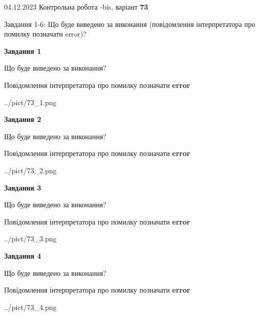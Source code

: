 \documentclass[12pt, ukrainian]{article}
\begin{document}
{{04.12.2023 Контрольна робота -bis, варіант  \No \textbf { 73 }\par}}
{

Завдання 1-6: Що буде виведено за виконання (повідомлення інтерпретатора про помилку позначати error)?


{\begin {center}\textbf{Завдання 1}\end {center}}\par
Що буде виведено за виконання? \par
Повідомлення інтерпретатора про помилку позначати \textbf{error}

\begin{center}
	{../pict/73_1.png}
\end{center}
\newpage

{\begin {center}\textbf{Завдання 2}\end {center}}\par
Що буде виведено за виконання? \par
Повідомлення інтерпретатора про помилку позначати \textbf{error}

\begin{center}
	{../pict/73_2.png}
\end{center}
\newpage

{\begin {center}\textbf{Завдання 3}\end {center}}\par
Що буде виведено за виконання? \par
Повідомлення інтерпретатора про помилку позначати \textbf{error}

\begin{center}
	{../pict/73_3.png}
\end{center}
\newpage

{\begin {center}\textbf{Завдання 4}\end {center}}\par
Що буде виведено за виконання? \par
Повідомлення інтерпретатора про помилку позначати \textbf{error}

\begin{center}
	{../pict/73_4.png}
\end{center}
\newpage

}
\end{document}
